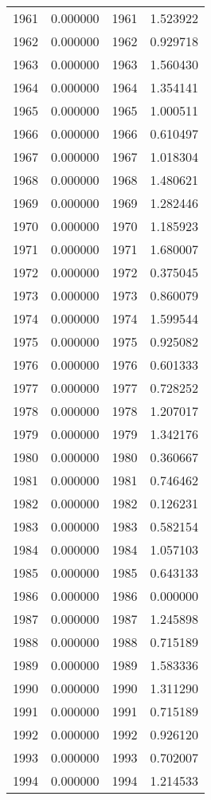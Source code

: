 \documentclass[12pt]{article}
\begin{document}
\begin{longtable}{@{}cccc@{}}
1961 & 0.000000 & 1961 & 1.523922 \\
1962 & 0.000000 & 1962 & 0.929718 \\
1963 & 0.000000 & 1963 & 1.560430 \\
1964 & 0.000000 & 1964 & 1.354141 \\
1965 & 0.000000 & 1965 & 1.000511 \\
1966 & 0.000000 & 1966 & 0.610497 \\
1967 & 0.000000 & 1967 & 1.018304 \\
1968 & 0.000000 & 1968 & 1.480621 \\
1969 & 0.000000 & 1969 & 1.282446 \\
1970 & 0.000000 & 1970 & 1.185923 \\
1971 & 0.000000 & 1971 & 1.680007 \\
1972 & 0.000000 & 1972 & 0.375045 \\
1973 & 0.000000 & 1973 & 0.860079 \\
1974 & 0.000000 & 1974 & 1.599544 \\
1975 & 0.000000 & 1975 & 0.925082 \\
1976 & 0.000000 & 1976 & 0.601333 \\
1977 & 0.000000 & 1977 & 0.728252 \\
1978 & 0.000000 & 1978 & 1.207017 \\
1979 & 0.000000 & 1979 & 1.342176 \\
1980 & 0.000000 & 1980 & 0.360667 \\
1981 & 0.000000 & 1981 & 0.746462 \\
1982 & 0.000000 & 1982 & 0.126231 \\
1983 & 0.000000 & 1983 & 0.582154 \\
1984 & 0.000000 & 1984 & 1.057103 \\
1985 & 0.000000 & 1985 & 0.643133 \\
1986 & 0.000000 & 1986 & 0.000000 \\
1987 & 0.000000 & 1987 & 1.245898 \\
1988 & 0.000000 & 1988 & 0.715189 \\
1989 & 0.000000 & 1989 & 1.583336 \\
1990 & 0.000000 & 1990 & 1.311290 \\
1991 & 0.000000 & 1991 & 0.715189 \\
1992 & 0.000000 & 1992 & 0.926120 \\
1993 & 0.000000 & 1993 & 0.702007 \\
1994 & 0.000000 & 1994 & 1.214533 \\

\end{longtable}
\end{document}
